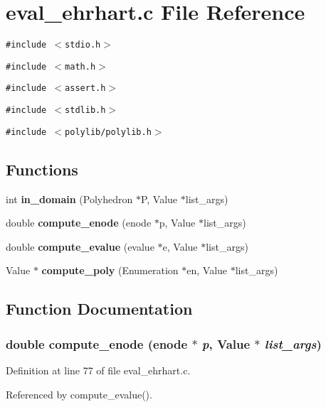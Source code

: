 \section{eval\_\-ehrhart.c File Reference}
\label{eval__ehrhart_8c}
{\tt \#include $<$stdio.h$>$}\par
{\tt \#include $<$math.h$>$}\par
{\tt \#include $<$assert.h$>$}\par
{\tt \#include $<$stdlib.h$>$}\par
{\tt \#include $<$polylib/polylib.h$>$}\par
\subsection*{Functions}
\begin{CompactItemize}
\item 
int {\bf in\_\-domain} (Polyhedron $\ast$P, Value $\ast$list\_\-args)
\item 
double {\bf compute\_\-enode} (enode $\ast$p, Value $\ast$list\_\-args)
\item 
double {\bf compute\_\-evalue} (evalue $\ast$e, Value $\ast$list\_\-args)
\item 
Value $\ast$ {\bf compute\_\-poly} (Enumeration $\ast$en, Value $\ast$list\_\-args)
\end{CompactItemize}


\subsection{Function Documentation}
\subsubsection{\setlength{\rightskip}{0pt plus 5cm}double compute\_\-enode (enode $\ast$ {\em p}, Value $\ast$ {\em list\_\-args})\hspace{0.3cm}{\tt  [static]}}\label{eval__ehrhart_8c_a1}




Definition at line 77 of file eval\_\-ehrhart.c.

Referenced by compute\_\-evalue().

